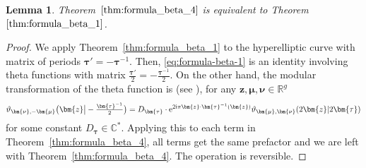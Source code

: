 \documentclass[pdftex]{sigma}
\numberwithin{equation}{section}
\newtheorem{Lemma}[Theorem]{Lemma}
\newcommand{\ee}{\mathrm{e}}
\begin{document}
\begin{Lemma}
Theorem~$\ref{thm:formula_beta_4}$ is equivalent to Theorem~$\ref{thm:formula_beta_1}$.
\end{Lemma}
\begin{proof} We apply Theorem~\ref{thm:formula_beta_1} to the hyperelliptic curve with
 matrix of periods $\bm{\tau}' = -\bm{\tau}^{-1}$. Then, \eqref{eq:formula-beta-1} is an identity
 involving theta functions with matrix
 $\frac{\bm{\tau'}}{2} = -\frac{\bm{\tau}^{-1}}{2}$. On the other hand, the
 modular transformation of the theta function is (see
 \cite[equation~(5.1)]{Tata1}), for any $\bm{z},\bm{\mu},\bm{\nu} \in \mathbb{R}^g$
 \begin{equation*}
 \begin{split}
	 \vartheta_{\bm{\nu}, -\bm{\mu}}\bigl(\bm{z}\big | -\tfrac{\bm{\tau}^{-1}}{2}\bigr) = D_{\bm{\tau}} \cdot \ee^{2{\rm i}\pi \bm{z} \cdot \bm{\tau}^{-1}(\bm{z})} \vartheta_{\bm{\mu}, \bm{\nu}}(2\bm{z} | 2\bm{\tau})
 \end{split}
 \end{equation*}
for some constant $D_{\bm{\tau}} \in \mathbb{C}^*$. Applying this to each term in Theorem~\ref{thm:formula_beta_4}, all terms get the same prefactor and we are left with Theorem~\ref{thm:formula_beta_4}. The operation is reversible.
\end{proof}
\end{document}
